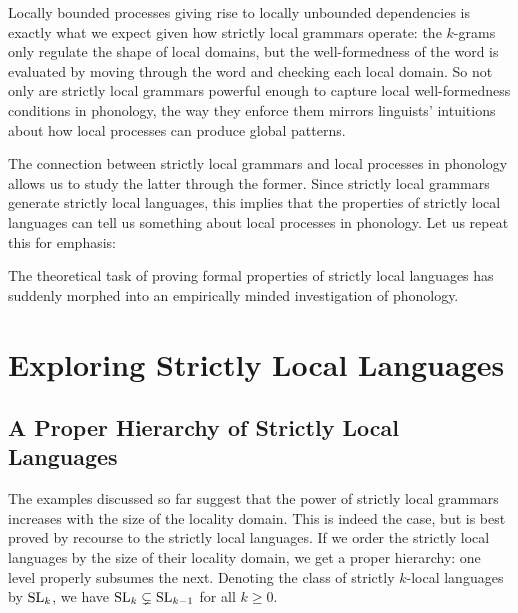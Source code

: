 %
%
Locally bounded processes giving rise to locally unbounded dependencies is exactly what we expect given how strictly local grammars operate: the $k$-grams only regulate the shape of local domains, but the well-formedness of the word is evaluated by moving through the word and checking each local domain.
So not only are strictly local grammars powerful enough to capture local well-formedness conditions in phonology, the way they enforce them mirrors linguists' intuitions about how local processes can produce global patterns.

The connection between strictly local grammars and local processes in phonology allows us to study the latter through the former.
Since strictly local grammars generate strictly local languages, this implies that the properties of strictly local languages can tell us something about local processes in phonology.
Let us repeat this for emphasis:
%
\begin{center}
\end{center}
%
The theoretical task of proving formal properties of strictly local languages has suddenly morphed into an empirically minded investigation of phonology.

\section{Exploring Strictly Local Languages}

\subsection{A Proper Hierarchy of Strictly Local Languages}
The examples discussed so far suggest that the power of strictly local grammars increases with the size of the locality domain.
This is indeed the case, but is best proved by recourse to the strictly local languages.
If we order the strictly local languages by the size of their locality domain, we get a proper hierarchy: one level properly subsumes the next.
Denoting the class of strictly $k$-local languages by $\mathrm{SL}_k$, we have $\mathrm{SL}_k \subsetneq \mathrm{SL}_{k-1}$ for all $k \geq 0$.

